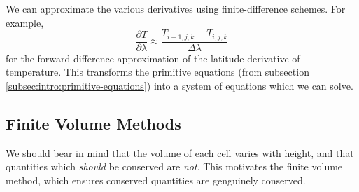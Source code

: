 We can approximate the various derivatives using finite-difference
schemes. For example,
\begin{equation}
\frac{\partial T}{\partial\lambda}\approx \frac{T_{i+1,j,k}-T_{i,j,k}}{\Delta\lambda}
\end{equation}
for the forward-difference approximation of the latitude derivative of
temperature. This transforms the primitive equations (from subsection
\ref{subsec:intro:primitive-equations}) into a system of equations which
we can solve.

\subsection{Finite Volume Methods}
We should bear in mind that the volume of each cell varies with height,
and that quantities which \emph{should} be conserved are
\emph{not}. This motivates the finite volume method, which ensures
conserved quantities are genguinely conserved.


